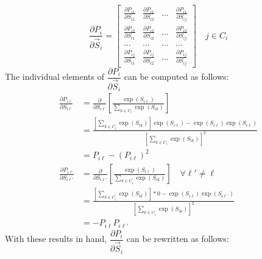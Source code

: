 \documentclass{article}
\begin{document}
\begin{equation}
\frac{\partial P_i}{\partial \vec{S}_{i}} = \left[ \begin{array}{cccc}
\frac{\partial P_{i1}}{\partial S_{i1}} & \frac{\partial P_{i1}}{\partial S_{i2}} & ... & \frac{\partial P_{i1}}{\partial S_{ij}}
\\[1.2ex]
\frac{\partial P_{i2}}{\partial S_{i1}} & \frac{\partial P_{i2}}{\partial S_{i2}} & ... & \frac{\partial P_{i2}}{\partial S_{ij}}
\\
... & ... & ... & ...
\\[1.2ex]
\frac{\partial P_{ij}}{\partial S_{i1}} & \frac{\partial P_{ij}}{\partial S_{i2}} & ... & \frac{\partial P_{ij}}{\partial S_{ij}}
\end{array} \right] \quad j \in C_i
\end{equation}
The individual elements of $\dfrac{\partial P_i}{\partial \vec{S}_{i}}$ can be computed as follows:
\begin{equation*}
\begin{aligned}
\frac{\partial P_{i \ell}}{\partial S_{i \ell}} &= \frac{\partial}{\partial S_{i \ell}} \left[ \frac{ \exp \left( S_{i \ell} \right) }{\sum _{k \in C_i} \exp \left( S_{i k} \right) } \right] 
\\
&= \frac{ \left[ \sum _{k \in C_i} \exp \left( S_{i k} \right) \right] \exp \left( S_{i \ell} \right) - \exp \left( S_{i \ell} \right) \exp \left( S_{i \ell} \right) }{ \left[ \sum _{k \in C_i} \exp \left( S_{i k} \right) \right]^2 }
 \\
&= P_{i \ell} - \left( P_{i \ell} \right)^2 
\\
\frac{\partial P_{i \ell}}{\partial S_{i \ell'}} &= \frac{\partial}{\partial S_{i \ell'}} \left[ \frac{ \exp \left( S_{i \ell} \right) }{\sum _{k \in C_i} \exp \left( S_{i k} \right) } \right] \quad \forall \ell' \neq \ell
\\
&=  \frac{ \left[ \sum _{k \in C_i} \exp \left( S_{i k} \right) \right] * 0 - \exp \left( S_{i \ell} \right) \exp \left( S_{i \ell'} \right) }{ \left[ \sum _{k \in C_i} \exp \left( S_{i k} \right) \right]^2 }
\\
&= -P_{i \ell} P_{i \ell'}
\end{aligned}
\end{equation*}
With these results in hand, $\dfrac{\partial P_i}{\partial \vec{S}_{i}}$ can be rewritten as follows:
\end{document}
